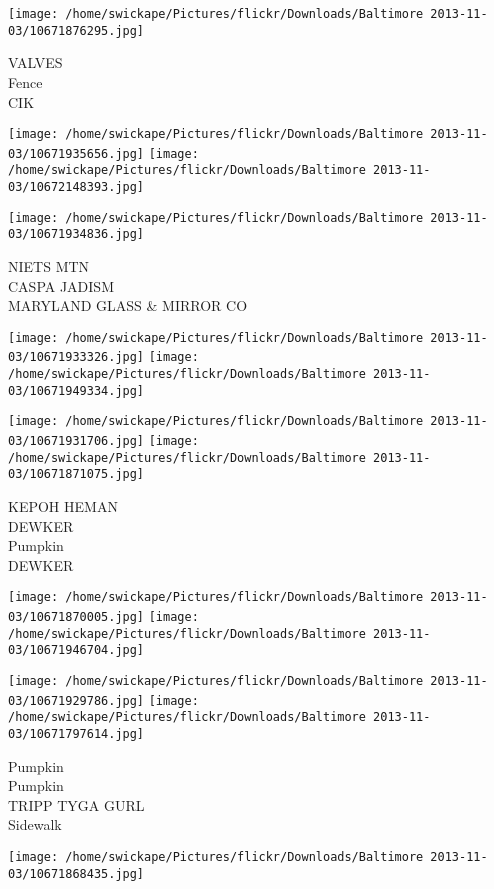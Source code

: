 \documentclass[10pt,letterpaper]{article}
\begin{document}
\vspace{0.25in}
\texttt{[image: /home/swickape/Pictures/flickr/Downloads/Baltimore 2013-11-03/10671876295.jpg]}

VALVES\\
Fence\\
CIK
\pagebreak

\texttt{[image: /home/swickape/Pictures/flickr/Downloads/Baltimore 2013-11-03/10671935656.jpg]}
\texttt{[image: /home/swickape/Pictures/flickr/Downloads/Baltimore 2013-11-03/10672148393.jpg]}

\vspace{0.25in}
\texttt{[image: /home/swickape/Pictures/flickr/Downloads/Baltimore 2013-11-03/10671934836.jpg]}

NIETS MTN\\
CASPA JADISM\\
MARYLAND GLASS \& MIRROR CO
\pagebreak

\texttt{[image: /home/swickape/Pictures/flickr/Downloads/Baltimore 2013-11-03/10671933326.jpg]}
\texttt{[image: /home/swickape/Pictures/flickr/Downloads/Baltimore 2013-11-03/10671949334.jpg]}

\texttt{[image: /home/swickape/Pictures/flickr/Downloads/Baltimore 2013-11-03/10671931706.jpg]}
\texttt{[image: /home/swickape/Pictures/flickr/Downloads/Baltimore 2013-11-03/10671871075.jpg]}

KEPOH HEMAN\\
DEWKER\\
Pumpkin\\
DEWKER
\pagebreak

\texttt{[image: /home/swickape/Pictures/flickr/Downloads/Baltimore 2013-11-03/10671870005.jpg]}
\texttt{[image: /home/swickape/Pictures/flickr/Downloads/Baltimore 2013-11-03/10671946704.jpg]}

\texttt{[image: /home/swickape/Pictures/flickr/Downloads/Baltimore 2013-11-03/10671929786.jpg]}
\texttt{[image: /home/swickape/Pictures/flickr/Downloads/Baltimore 2013-11-03/10671797614.jpg]}

Pumpkin\\
Pumpkin\\
TRIPP TYGA GURL\\
Sidewalk
\pagebreak

\texttt{[image: /home/swickape/Pictures/flickr/Downloads/Baltimore 2013-11-03/10671868435.jpg]}
\end{document}
